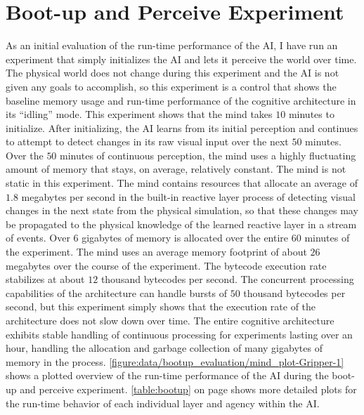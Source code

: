 \section{Boot-up and Perceive Experiment}

As an initial evaluation of the run-time performance of the AI, I have
run an experiment that simply initializes the AI and lets it perceive
the world over time.  The physical world does not change during this
experiment and the AI is not given any goals to accomplish, so this
experiment is a control that shows the baseline memory usage and
run-time performance of the cognitive architecture in its ``idling''
mode.  This experiment shows that the mind takes $10$ minutes to
initialize.  After initializing, the AI learns from its initial
perception and continues to attempt to detect changes in its raw
visual input over the next $50$ minutes.  Over the $50$ minutes of
continuous perception, the mind uses a highly fluctuating amount of
memory that stays, on average, relatively constant.  The mind is not
static in this experiment.  The mind contains resources that allocate
an average of $1.8$ megabytes per second in the built-in reactive
layer process of detecting visual changes in the next state from the
physical simulation, so that these changes may be propagated to the
physical knowledge of the learned reactive layer in a stream of
events.  Over $6$ gigabytes of memory is allocated over the entire
$60$ minutes of the experiment.  The mind uses an average memory
footprint of about $26$ megabytes over the course of the experiment.
The bytecode execution rate stabilizes at about $12$ thousand
bytecodes per second.  The concurrent processing capabilities of the
architecture can handle bursts of $50$ thousand bytecodes per second,
but this experiment simply shows that the execution rate of the
architecture does not slow down over time.  The entire cognitive
architecture exhibits stable handling of continuous processing for
experiments lasting over an hour, handling the allocation and garbage
collection of many gigabytes of memory in the process.
{\mbox{\autoref{figure:data/bootup_evaluation/mind_plot-Gripper-1}}}
shows a plotted overview of the run-time performance of the AI during
the boot-up and perceive experiment.  \autoref{table:bootup} on page
\pageref{table:bootup} shows more detailed plots for the run-time
behavior of each individual layer and agency within the AI.

